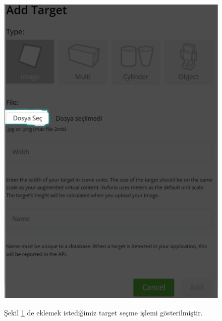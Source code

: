 \documentclass[12pt, a4paper]{article}
\begin{document}
	\newpage
	\begin{figure}[!ht]
		\caption{}
		\centering
		\includegraphics[angle=0, width=\textwidth]{Vuforia12.PNG}
		
		\label{gantt9}
		Şekil \ref{gantt9} de eklemek istediğimiz target seçme işlemi gösterilmiştir.\cite{Vuforia}	
	\end{figure}
\end{document}
